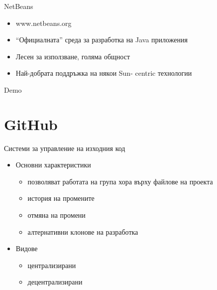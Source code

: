 \documentclass{beamer}
\begin{document}
\begin{frame}{NetBeans}
  \transdissolve  
  \begin{itemize}
    \item www.netbeans.org
    \item “Официалната” среда за разработка на
    Java приложения
    \item Лесен за използване, голяма общност
    \item Най-добрата поддръжка на някои Sun-
    centric технологии
  \end{itemize}
\end{frame}

\begin{frame}{Demo}
  \transdissolve  
\end{frame}

\section{GitHub}
\begin{frame}{Системи за управление на изходния код}
  \transdissolve
  \begin{itemize}
  \item Основни характеристики
    \begin{itemize}
      \item позволяват работата на група хора върху файлове на проекта
      \item история на промените
      \item отмяна на промени
      \item алтернативни клонове на разработка
    \end{itemize}
  \item Видове
    \begin{itemize}
      \item централизирани
      \item децентрализирани
    \end{itemize}
  \end{itemize}
\end{frame}
\end{document}

